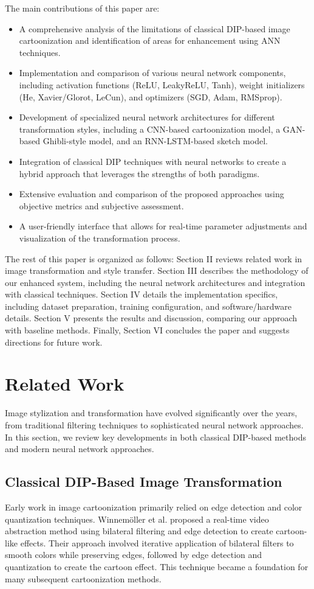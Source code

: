 \documentclass[conference]{IEEEtran}
\begin{document}
The main contributions of this paper are:
\begin{itemize}
    \item A comprehensive analysis of the limitations of classical DIP-based image cartoonization and identification of areas for enhancement using ANN techniques.
    \item Implementation and comparison of various neural network components, including activation functions (ReLU, LeakyReLU, Tanh), weight initializers (He, Xavier/Glorot, LeCun), and optimizers (SGD, Adam, RMSprop).
    \item Development of specialized neural network architectures for different transformation styles, including a CNN-based cartoonization model, a GAN-based Ghibli-style model, and an RNN-LSTM-based sketch model.
    \item Integration of classical DIP techniques with neural networks to create a hybrid approach that leverages the strengths of both paradigms.
    \item Extensive evaluation and comparison of the proposed approaches using objective metrics and subjective assessment.
    \item A user-friendly interface that allows for real-time parameter adjustments and visualization of the transformation process.
\end{itemize}

The rest of this paper is organized as follows: Section II reviews related work in image transformation and style transfer. Section III describes the methodology of our enhanced system, including the neural network architectures and integration with classical techniques. Section IV details the implementation specifics, including dataset preparation, training configuration, and software/hardware details. Section V presents the results and discussion, comparing our approach with baseline methods. Finally, Section VI concludes the paper and suggests directions for future work.

\section{Related Work}
Image stylization and transformation have evolved significantly over the years, from traditional filtering techniques to sophisticated neural network approaches. In this section, we review key developments in both classical DIP-based methods and modern neural network approaches.

\subsection{Classical DIP-Based Image Transformation}
Early work in image cartoonization primarily relied on edge detection and color quantization techniques. Winnemöller et al. \cite{winnemöller2006real} proposed a real-time video abstraction method using bilateral filtering and edge detection to create cartoon-like effects. Their approach involved iterative application of bilateral filters to smooth colors while preserving edges, followed by edge detection and quantization to create the cartoon effect. This technique became a foundation for many subsequent cartoonization methods.
\end{document}
